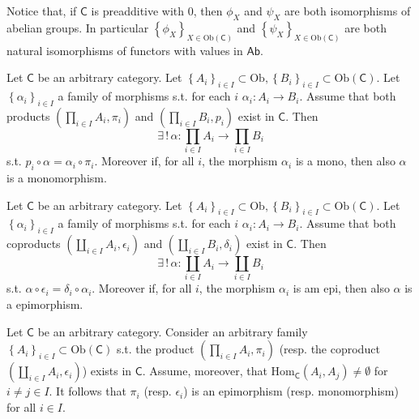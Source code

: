 \begin{rem}
	Notice that, if $\mathsf{C}$ is preadditive with $0$,
	then $\phi_X$ and $\psi_X$ are both isomorphisms of abelian groups.
	In particular $\left\{ \phi_X \right\}_{X \in \mathrm{Ob} \left(\mathsf{C}\right)}$ 
	and $\left\{ \psi_X \right\}_{X \in \mathrm{Ob} \left(\mathsf{C}\right)}$ are both natural
	isomorphisms of functors with values in $\mathsf{Ab}$.
\end{rem}

\begin{prop}
	Let $\mathsf{C}$ be an arbitrary category.
	Let $\left\{ A_i \right\}_{i \in I} \subset \mathrm{Ob}, \left\{ B_i \right\}_{i \in I}
	\subset \mathrm{Ob} \left(\mathsf{C}\right)$.
	Let $\left\{ \alpha_i \right\}_{i \in I}$ a family of morphisms s.t. for each $i$ $\alpha_i: A_i \to B_i$.
	Assume that both products $\left(\prod_{i \in I} A_i , \pi_i\right)$ and $\left(\prod_{i \in I} B_i, p_i\right)$ exist in $\mathsf{C}$.
	Then 
	\begin{equation}
	\exists\, !\, \alpha: \prod_{i \in I} A_i  \to \prod_{i \in I} B_i
	\end{equation} 
	s.t. $p_i \circ \alpha = \alpha_i \circ \pi_i$.
	Moreover if, for all $i$, the morphism $\alpha_i$ is a mono, then also $\alpha$ is a monomorphism.
\end{prop} 

\begin{prop}
	Let $\mathsf{C}$ be an arbitrary category.
	Let $\left\{ A_i \right\}_{i \in I} \subset \mathrm{Ob}, \left\{ B_i \right\}_{i \in I}
	\subset \mathrm{Ob} \left(\mathsf{C}\right)$.
	Let $\left\{ \alpha_i \right\}_{i \in I}$ a family of morphisms s.t. for each $i$ $\alpha_i: A_i \to B_i$.
	Assume that both coproducts $\left(\coprod_{i \in I} A_i , \epsilon_i\right)$ and
	$\left(\coprod_{i \in I} B_i, \delta_i\right)$ exist in $\mathsf{C}$.
	Then 
	\begin{equation}
	\exists\, !\, \alpha: \coprod_{i \in I} A_i  \to \coprod_{i \in I} B_i
	\end{equation} 
	s.t. $\alpha \circ \epsilon_i = \delta_i \circ \alpha_i$.
	Moreover if, for all $i$, the morphism $\alpha_i$ is am epi, then also $\alpha$ is a epimorphism.
\end{prop} 

\begin{prop}
	Let $\mathsf{C}$ be an arbitrary category.
	Consider an arbitrary family $\left\{ A_i \right\}_{i \in I} \subset \mathrm{Ob} \left(\mathsf{C}\right)$ s.t.
	the product $\left(\prod_{i \in I} A_i, \pi_i\right)$ (resp. the coproduct $\left(\coprod_{i \in I} A_i, \epsilon_i \right)$) exists in $\mathsf{C}$.
	Assume, moreover, that $\mathrm{Hom}_{\mathsf{C}} \left( A_i, A_j \right) \neq \emptyset$ for $i \neq j \in I$.
	It follows that $\pi_i$ (resp. $\epsilon_i$) is an epimorphism (resp. monomorphism) for all $i \in I$.
\end{prop} 


